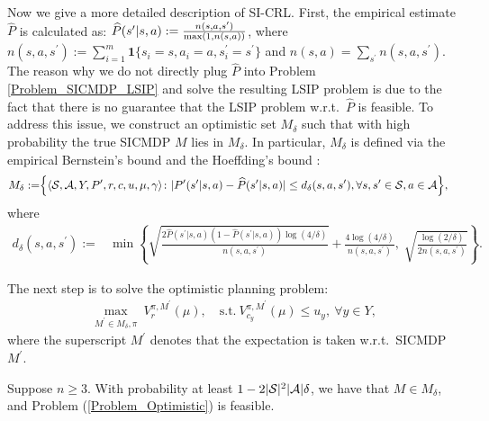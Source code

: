 Now we give a more detailed description of SI-CRL.
First, the empirical estimate $\widehat P$ is calculated as:
$\widehat P(s^\prime|s, a):=\frac{n(s, a, s^\prime)}{\max\left({1,n(s,a)}\right)}$,
where $n(s,a,s^\prime) :=\sum_{i=1}^m \mathbf{1}\{s_i=s, a_i=a, s_i^\prime=s^\prime\}$ and $n(s,a)=\sum_{s^\prime} n(s,a,s^\prime)$.
The reason why we do not directly plug $\widehat P$ into Problem \eqref{Problem_SICMDP_LSIP} and solve the resulting LSIP problem is due to the fact that there is no guarantee that the LSIP problem w.r.t.\ $\widehat P$ is feasible.
To address this issue, we construct an optimistic set $M_\delta$ such that with high probability the true SICMDP $M$ lies in $M_\delta$.
In particular, $M_\delta$ is defined via the empirical Bernstein's bound and the Hoeffding's bound \citep{LATTIMORE2014125}:
\begin{align*}
M_\delta :=& \Big\{\langle {\mathcal{S}},{\mathcal{A}},Y,P^\prime,r,c,u,\mu, \gamma \rangle\colon  |P^\prime(s^\prime|s,a)-\widehat P(s^\prime|s,a)| \leq d_\delta(s,a,s^\prime), \forall s, s^\prime\in {\mathcal{S}}, a\in {\mathcal{A}} \Big\},
\end{align*}
where 
\begin{align*}
d_\delta(s,a,s^\prime):=&\min\left\{\sqrt{\frac{2\widehat P(s^\prime|s,a)(1 {-} \widehat P(s^\prime|s,a))\log(4/\delta)}{n(s,a,s^\prime)}}+\frac{4\log (4/\delta)}{n(s,a,s^\prime)}, \; \sqrt{\frac{\log (2/\delta)}{2n(s,a,s^\prime)}}\right\}.
\end{align*}


The next step is to solve the optimistic planning problem:
\begin{equation}\label{Problem_Optimistic}
\begin{aligned}
\max_{M^\prime\in M_\delta,\pi}\ V_r^{\pi,M^\prime}(\mu),\quad
\text{s.t.}\ V_{c_y}^{\pi,M^\prime}(\mu) \leq u_y,\ \forall y\in Y,
\end{aligned}
\end{equation}
where the superscript $M^\prime$ denotes that the expectation is taken w.r.t.\ SICMDP $M^\prime$.
\begin{theorem}\label{Theorem_Feasible}
Suppose $n\geq 3$. With probability at least $1-2|{\mathcal{S}}|^2|{\mathcal{A}}|\delta$, we have that $M\in M_\delta$, and Problem (\ref{Problem_Optimistic}) is feasible.
\end{theorem}

